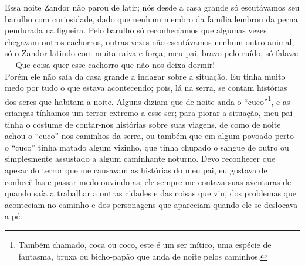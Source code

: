 Essa noite Zandor não parou de latir; nós desde a casa grande só escutávamos seu barulho com curiosidade, dado que nenhum membro da família lembrou da perna pendurada na figueira. Pelo barulho só reconhecíamos que algumas vezes chegavam outros cachorros, outras vezes não escutávamos nenhum outro animal, só o Zandor latindo com muita raiva e força; meu pai, bravo pelo ruído, só falava:\\\indent
--- Que coisa quer esse cachorro que não nos deixa dormir!\\\indent
Porém ele não saía da casa grande a indagar sobre a situação. Eu tinha muito medo por tudo o que estava acontecendo; pois, lá na serra, se contam histórias dos seres que habitam a noite. 
Alguns diziam que de noite anda o ``cuco''\footnote{Também chamado, coca ou coco, este é um ser mítico, uma espécie de fantasma, bruxa ou bicho-papão que anda de noite pelos caminhos.}, e as crianças tínhamos um terror extremo a esse ser; para piorar a situação, meu pai tinha o costume de contar-nos histórias sobre suas viagens, de como de noite achou o ``cuco'' nos caminhos da serra, ou também que em algum povoado perto o ``cuco'' tinha matado algum vizinho, que tinha chupado o sangue de outro ou simplesmente assustado a algum caminhante noturno. Devo reconhecer que apesar do terror que me causavam as histórias do meu pai, eu gostava de conhecê-las e passar medo ouvindo-as; ele sempre me contava suas aventuras de quando saía a trabalhar a outras cidades e das coisas que viu, dos problemas que aconteciam no caminho e dos personagens que apareciam quando ele se deslocava a pé.

